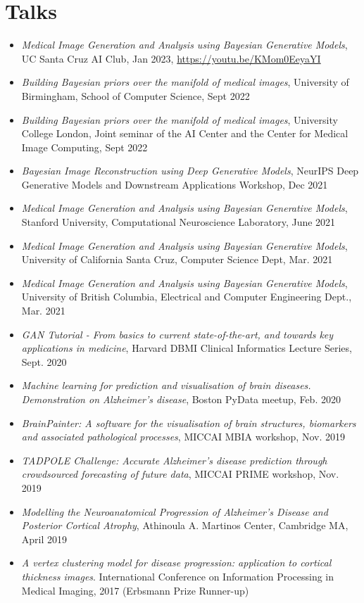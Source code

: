\documentclass[a4paper,10pt]{article} %
\begin{document}
\section*{Talks}
\begin{itemize}
\item \emph{Medical Image Generation and Analysis using Bayesian Generative Models}, UC Santa Cruz AI Club, Jan 2023, \url{https://youtu.be/KMom0EeyaYI}
\item \emph{Building Bayesian priors over the manifold of medical images}, University of Birmingham, School of Computer Science, Sept 2022
\item \emph{Building Bayesian priors over the manifold of medical images}, University College London, Joint seminar of the AI Center and the Center for Medical Image Computing, Sept 2022
\item \emph{Bayesian Image Reconstruction using Deep Generative Models}, NeurIPS Deep Generative Models and Downstream Applications Workshop, Dec 2021 
 \item \emph{Medical Image Generation and Analysis using Bayesian Generative Models}, Stanford University, Computational Neuroscience Laboratory, June 2021
 \item \emph{Medical Image Generation and Analysis using Bayesian Generative Models}, University of California Santa Cruz, Computer Science Dept, Mar. 2021
 \item \emph{Medical Image Generation and Analysis using Bayesian Generative Models}, University of British Columbia, Electrical and Computer Engineering Dept., Mar. 2021
 \item \emph{GAN Tutorial - From basics to current state-of-the-art, and towards key applications in medicine}, Harvard DBMI Clinical Informatics Lecture Series, Sept. 2020
 \item \emph{Machine learning for prediction and visualisation of brain diseases. Demonstration on Alzheimer's disease}, Boston PyData meetup, Feb. 2020
 \item \emph{BrainPainter: A software for the visualisation of brain structures, biomarkers and associated pathological processes}, MICCAI MBIA workshop, Nov. 2019
 \item \emph{TADPOLE Challenge: Accurate Alzheimer's disease prediction through crowdsourced forecasting of future data}, MICCAI PRIME workshop, Nov. 2019
 \item \emph{Modelling the Neuroanatomical Progression of Alzheimer's Disease and Posterior Cortical Atrophy}, Athinoula A. Martinos Center, Cambridge MA, April 2019
 \item \emph{A vertex clustering model for disease progression: application to cortical thickness images}. International Conference on Information Processing in Medical Imaging, 2017 (Erbsmann Prize Runner-up)
\end{itemize}
\end{document}
